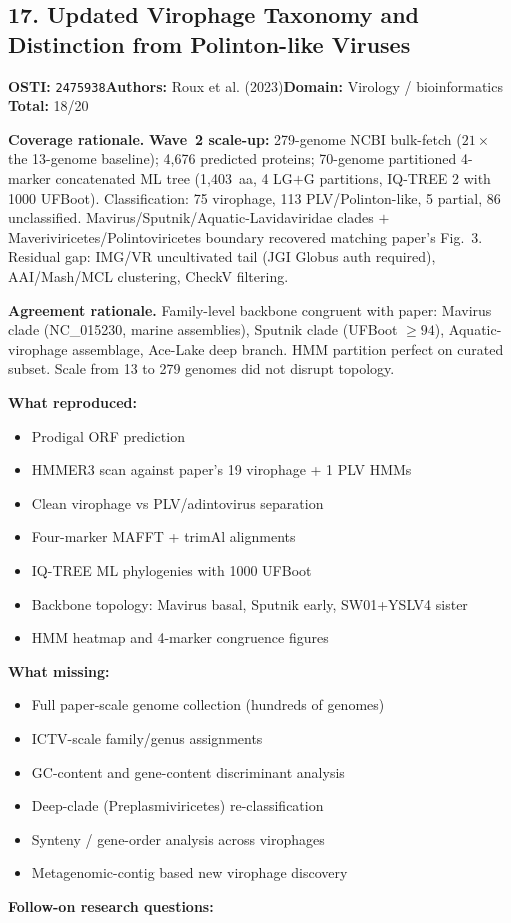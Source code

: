 \subsection{17. Updated Virophage Taxonomy and Distinction from Polinton-like Viruses}
\textbf{OSTI:} \texttt{2475938}\quad\textbf{Authors:} Roux et al. (2023)\quad\textbf{Domain:} Virology / bioinformatics\\
\quad{}\quad\textbf{Total:} 18/20\par\smallskip
\noindent\textbf{Coverage rationale.} \textbf{Wave~2 scale-up:} 279-genome NCBI bulk-fetch ($21\times$ the 13-genome baseline); 4,676 predicted proteins; 70-genome partitioned 4-marker concatenated ML tree (1,403~aa, 4 LG$+$G partitions, IQ-TREE 2 with 1000 UFBoot). Classification: 75 virophage, 113 PLV/Polinton-like, 5 partial, 86 unclassified. Mavirus/Sputnik/Aquatic-Lavidaviridae clades $+$ Maveriviricetes/Polintoviricetes boundary recovered matching paper's Fig.~3. Residual gap: IMG/VR uncultivated tail (JGI Globus auth required), AAI/Mash/MCL clustering, CheckV filtering.\par
\noindent\textbf{Agreement rationale.} Family-level backbone congruent with paper: Mavirus clade (NC\_015230, marine assemblies), Sputnik clade (UFBoot $\geq 94$), Aquatic-virophage assemblage, Ace-Lake deep branch. HMM partition perfect on curated subset. Scale from 13 to 279 genomes did not disrupt topology.\par\smallskip
\noindent\textbf{What reproduced:}
\begin{itemize}[leftmargin=1.4em,itemsep=0.2em,topsep=0.2em]
\item Prodigal ORF prediction
\item HMMER3 scan against paper's 19 virophage + 1 PLV HMMs
\item Clean virophage vs PLV/adintovirus separation
\item Four-marker MAFFT + trimAl alignments
\item IQ-TREE ML phylogenies with 1000 UFBoot
\item Backbone topology: Mavirus basal, Sputnik early, SW01+YSLV4 sister
\item HMM heatmap and 4-marker congruence figures
\end{itemize}\noindent\textbf{What missing:}
\begin{itemize}[leftmargin=1.4em,itemsep=0.2em,topsep=0.2em]
\item Full paper-scale genome collection (hundreds of genomes)
\item ICTV-scale family/genus assignments
\item GC-content and gene-content discriminant analysis
\item Deep-clade (Preplasmiviricetes) re-classification
\item Synteny / gene-order analysis across virophages
\item Metagenomic-contig based new virophage discovery
\end{itemize}\noindent\textbf{Follow-on research questions:}

